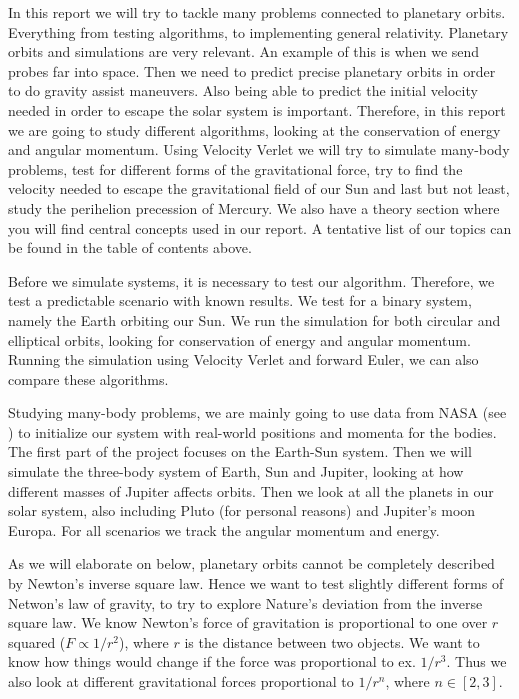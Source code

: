 \documentclass[reprint, english,notitlepage,nofootinbib]{revtex4-1}  %
\begin{document}
In this report we will try to tackle many problems connected to planetary orbits. Everything from testing algorithms, to implementing general relativity. Planetary orbits and simulations are very relevant. An example of this is when we send probes far into space. Then we need to predict precise planetary orbits in order to do gravity assist maneuvers. Also being able to predict the initial velocity needed in order to escape the solar system is important. Therefore, in this report we are going to study different algorithms, looking at the conservation of energy and angular momentum. Using Velocity Verlet we will try to simulate many-body problems, test for different forms of the gravitational force, try to find the velocity needed to escape the gravitational field of our Sun and last but not least, study the perihelion precession of Mercury. We also have a theory section where you will find central concepts used in our report. A tentative list of our topics can be found in the table of contents above.

Before we simulate systems, it is necessary to test our algorithm. Therefore, we test a predictable scenario with known results. We test for a binary system, namely the Earth orbiting our Sun. We run the simulation for both circular and elliptical orbits, looking for conservation of energy and angular momentum. Running the simulation using Velocity Verlet and forward Euler, we can also compare these algorithms.

Studying many-body problems, we are mainly going to use data from NASA (see \citep{NASA}) to initialize our system with real-world positions and momenta for the bodies. The first part of the project focuses on the Earth-Sun system. Then we will simulate the three-body system of Earth, Sun and Jupiter, looking at how different masses of Jupiter affects orbits. Then we look at all the planets in our solar system, also including Pluto (for personal reasons) and Jupiter's moon Europa. For all scenarios we track the angular momentum and energy.

As we will elaborate on below, planetary orbits cannot be completely described by Newton's inverse square law. Hence we want to test slightly different forms of Netwon's law of gravity, to try to explore Nature's deviation from the inverse square law. We know Newton's force of gravitation is proportional to one over $r$ squared ($F\propto1/r^2$), where $r$ is the distance between two objects. We want to know how things would change if the force was proportional to ex. $1/r^3$. Thus we also look at different gravitational forces proportional to $1/r^n$, where $n\in [2,3]$.
\end{document}
